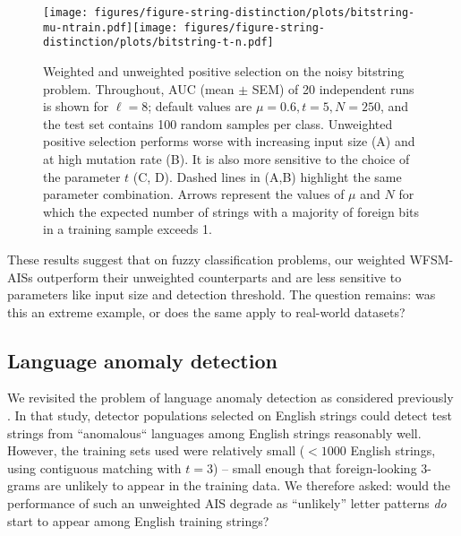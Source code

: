 \documentclass{llncs}
\begin{document}
\begin{figure}[t]
  \centering
   \texttt{[image: figures/figure-string-distinction/plots/bitstring-mu-ntrain.pdf]}\texttt{[image: figures/figure-string-distinction/plots/bitstring-t-n.pdf]}

   \caption{
	Weighted and unweighted positive selection on the noisy bitstring problem. Throughout, AUC 
	(mean $\pm$ SEM) of 20 independent runs is shown for $\ell=8$; default values 
	are $\mu=0.6, t=5, N=250$, and the test set contains 100 random samples per class.
	Unweighted positive selection performs worse with increasing input size (A) and
	at high mutation rate (B). It is also more sensitive to the choice of the parameter 
	$t$ (C, D). Dashed lines in (A,B) highlight the same parameter combination.
	Arrows represent the values of $\mu$ and $N$ for which the expected number of strings 
	with a majority of foreign bits in a training  sample exceeds 1. 
  }
  \label{figurestringdistinction}
\end{figure}


These results suggest that on fuzzy classification problems, our weighted 
WFSM-AISs outperform their unweighted counterparts and are less sensitive
to parameters like input size and detection threshold. The question remains: was this
an extreme example, or does the same apply to real-world datasets?

\subsection{Language anomaly detection}

We revisited the problem of language anomaly detection as 
considered previously \cite{Wortel2020t}. In that study, detector populations 
selected on English strings could detect test strings from ``anomalous`` 
languages among English strings reasonably well. However, the training sets used were relatively 
small ($< 1000$ English strings, using contiguous matching with $t=3$) -- small enough 
that foreign-looking 3-grams are unlikely to appear in the training data. We therefore 
asked: would the performance 
of such an unweighted AIS degrade as ``unlikely'' letter patterns \emph{do} start to appear
among English training strings?
\end{document}
